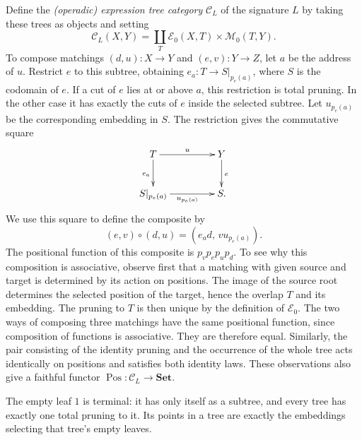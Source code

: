 \documentclass[11pt,a4paper]{article}
\theoremstyle{plain}
\theoremstyle{definition}
\theoremstyle{remark}
\newcommand{\C}{\mathcal C}
\newcommand{\Ocat}{\mathcal M}
\newcommand{\Dcat}{\mathcal E}
\newcommand{\one}{1}
\newcommand{\Pos}{\operatorname{Pos}}
\begin{document}
Define the \emph{(operadic) expression tree category} $\C_L$ of the
signature $L$ by taking these trees as objects and setting
\begin{equation}\label{eq:modelhom}
\C_L(X,Y)=\coprod_T\Dcat_0(X,T)\times\Ocat_0(T,Y).
\end{equation}
To compose matchings $(d,u):X\to Y$ and $(e,v):Y\to Z$, let $a$
be the address of $u$. Restrict $e$ to this subtree, obtaining
$e_a:T\to S|_{p_e(a)}$, where $S$ is the codomain of $e$.
If a cut of $e$ lies at or above $a$, this restriction is total
pruning. In the other case it has exactly the cuts of $e$ inside
the selected subtree. Let $u_{p_e(a)}$ be the corresponding
embedding in $S$. The restriction gives the commutative square
\[
\xymatrix@C=4.5em@R=2.5em{
T\ar[r]^u\ar[d]_{e_a}&Y\ar[d]^e\\
S|_{p_e(a)}\ar[r]_{u_{p_e(a)}}&S.
}
\]
We use this square to define the composite by
\[
(e,v)\circ(d,u)=(e_a d,\,v u_{p_e(a)}).
\]
The positional function of this composite is $p_vp_ep_up_d$.
To see why this composition is associative, observe first that a
matching with given source and target is determined by its action
on positions. The image of the source root determines the selected
position of the target, hence the overlap $T$ and its embedding.
The pruning to $T$ is then unique by the definition of $\Dcat_0$.
The two ways of composing three matchings have the same positional
function, since composition of functions is associative. They are
therefore equal. Similarly, the pair consisting of the identity
pruning and the occurrence of the whole tree acts identically on
positions and satisfies both identity laws. These observations also
give a faithful functor $\Pos:\C_L\to\mathbf{Set}$.

The empty leaf $\one$ is terminal: it has only itself as a subtree,
and every tree has exactly one total pruning to it. Its points in a
tree are exactly the embeddings selecting that tree's empty leaves.
\end{document}
